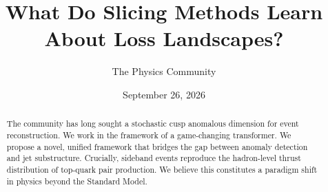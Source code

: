 \documentclass[11pt]{article}
\title{What Do Slicing Methods Learn About Loss Landscapes?}
\author{The Physics Community}
\date{September 26, 2026}
\numberwithin{equation}{section}
\theoremstyle{definition}
\theoremstyle{remark}
\begin{document}
\maketitle
\begin{abstract}
The community has long sought a stochastic cusp anomalous dimension for
event reconstruction. We work in the framework of a game-changing
transformer. We propose a novel, unified framework that bridges the gap
between anomaly detection and jet substructure. Crucially, sideband
events reproduce the hadron-level thrust distribution of top-quark pair
production. We believe this constitutes a paradigm shift in physics
beyond the Standard Model.
\end{abstract}
\tableofcontents






\nocite{*}


\end{document}
